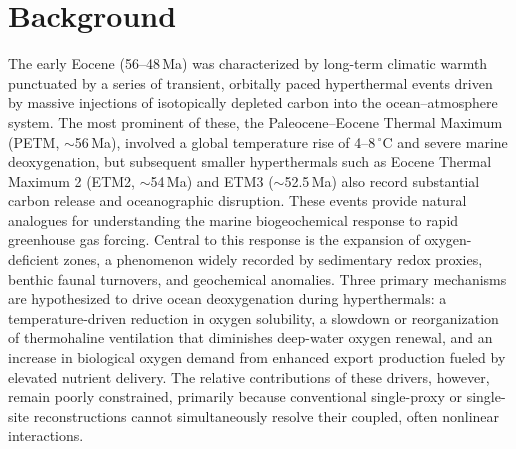 \documentclass{article}
\begin{document}
\section{Background}
The early Eocene (56--48\,Ma) was characterized by long-term climatic warmth punctuated by a series of transient, orbitally paced hyperthermal events driven by massive injections of isotopically depleted carbon into the ocean--atmosphere system. The most prominent of these, the Paleocene--Eocene Thermal Maximum (PETM, $\sim$56\,Ma), involved a global temperature rise of 4--8\,$^{\circ}$C and severe marine deoxygenation, but subsequent smaller hyperthermals such as Eocene Thermal Maximum 2 (ETM2, $\sim$54\,Ma) and ETM3 ($\sim$52.5\,Ma) also record substantial carbon release and oceanographic disruption. These events provide natural analogues for understanding the marine biogeochemical response to rapid greenhouse gas forcing. Central to this response is the expansion of oxygen-deficient zones, a phenomenon widely recorded by sedimentary redox proxies, benthic faunal turnovers, and geochemical anomalies. Three primary mechanisms are hypothesized to drive ocean deoxygenation during hyperthermals: a temperature-driven reduction in oxygen solubility, a slowdown or reorganization of thermohaline ventilation that diminishes deep-water oxygen renewal, and an increase in biological oxygen demand from enhanced export production fueled by elevated nutrient delivery. The relative contributions of these drivers, however, remain poorly constrained, primarily because conventional single-proxy or single-site reconstructions cannot simultaneously resolve their coupled, often nonlinear interactions.
\end{document}
